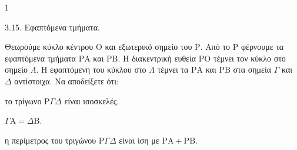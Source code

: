 \begin{ylh}{1}
    \item 3.15. Εφαπτόμενα τμήματα.
\end{ylh}
Θεωρούμε κύκλο κέντρου $\mathrm{O}$ και εξωτερικό σημείο του $\mathrm{P}$. Από το $\mathrm{P}$ φέρνουμε τα εφαπτόμενα τμήματα $\mathrm{P}\mathrm{A}$ και $\mathrm{P}\mathrm{B}$. Η διακεντρική ευθεία $\mathrm{P}\mathrm{O}$ τέμνει τον κύκλο στο σημείο $\Lambda$. Η εφαπτόμενη του κύκλου στο $\Lambda$ τέμνει τα $\mathrm{P}\mathrm{A}$ και $\mathrm{P}\mathrm{B}$ στα σημεία $\Gamma$ και $\Delta$ αντίστοιχα.
Να αποδείξετε ότι:
\begin{alist}
    \item το τρίγωνο $\mathrm{P}\Gamma\Delta$ είναι ισοσκελές. 
    \item $\Gamma\mathrm{A} = \Delta\mathrm{B}$. 
    \item η περίμετρος του τριγώνου $\mathrm{P}\Gamma\Delta$ είναι ίση με $\mathrm{P}\mathrm{A} + \mathrm{P}\mathrm{B}$. 
\end{alist}
